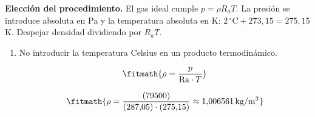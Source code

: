 \noindent\textbf{Elección del procedimiento.} El gas ideal cumple $p=\rho R_aT$. La presión se introduce absoluta en Pa y la temperatura absoluta en K: $2\,^{\circ}\mathrm C+273{,}15=275{,}15$ K. Despejar densidad dividiendo por $R_aT$.

\begin{enumerate}

\item No introducir la temperatura Celsius en un producto termodinámico.

\[\fitmath{\rho=\frac{p}{\mathrm{Ra}\cdot T}}\]

\[\fitmath{\rho=\frac{(79500)}{(287{,}05)\cdot (275{,}15)}\approx 1{,}006561\,\mathrm{kg/m^{3}}}\]

\end{enumerate}
